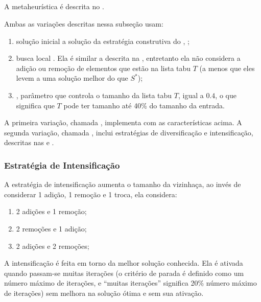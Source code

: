 \subsection{\tabu}
\label{subsection:tabu}

A metaheurística \tabu é descrita no .

Ambas as variações descritas nessa subseção usam:

\begin{enumerate}
    \item solução inicial a solução da estratégia construtiva do \grasp, ;
    \item busca local \bestImproving. Ela é similar a \bestImproving descrita na , entretanto ela não considera a adição ou remoção de elementos que estão na lista tabu $T$ (a menos que eles levem a uma solução melhor do que $S^*$);
    \item \tenureRatio, parâmetro que controla o tamanho da lista tabu $T$, igual a $0.4$, o que significa que $T$ pode ter tamanho até 40\% do tamanho da entrada.
\end{enumerate}

A primeira variação, chamada \tabuVanilla, implementa \tabu com as características acima. A segunda variação, chamada \tabuMod, inclui estratégias de diversificação e intensificação, descritas nas  e .

\subsubsection{Estratégia de Intensificação}
\label{subsubsection:tabu-intensification}

A estratégia de intensificação aumenta o tamanho da vizinhaça, ao invés de considerar 1 adição, 1 remoção e 1 troca, ela considera:

\begin{enumerate}
    \item 2 adições e 1 remoção;
    \item 2 remoções e 1 adição;
    \item 2 adições e 2 remoções;
\end{enumerate}

A intensificação é feita em torno da melhor solução conhecida. Ela é ativada quando passam-se muitas iterações (o critério de parada é definido como um número máximo de iterações, e ``muitas iterações'' significa 20\% número máximo de iterações) sem melhora na solução ótima e sem sua ativação.

